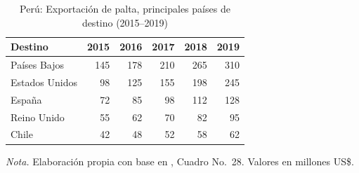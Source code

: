 \begin{table}[H]
\centering
\caption{Per\'u: Exportaci\'on de palta, principales pa\'ises de destino (2015--2019)}
\label{tab:destinos_export}
\small
\begin{tabular}{lrrrrr}
\toprule
\textbf{Destino} & \textbf{2015} & \textbf{2016} & \textbf{2017} & \textbf{2018} & \textbf{2019} \\
\midrule
Pa\'ises Bajos & 145 & 178 & 210 & 265 & 310 \\
Estados Unidos &  98 & 125 & 155 & 198 & 245 \\
Espa\~na        &  72 &  85 &  98 & 112 & 128 \\
Reino Unido    &  55 &  62 &  70 &  82 &  95 \\
Chile          &  42 &  48 &  52 &  58 &  62 \\
\bottomrule
\end{tabular}
\parbox{0.94\textwidth}{\small \textit{Nota.} Elaboraci\'on propia con base en \citep{SierraSelva2020}, Cuadro No.~28. Valores en millones US\$.}
\end{table}
